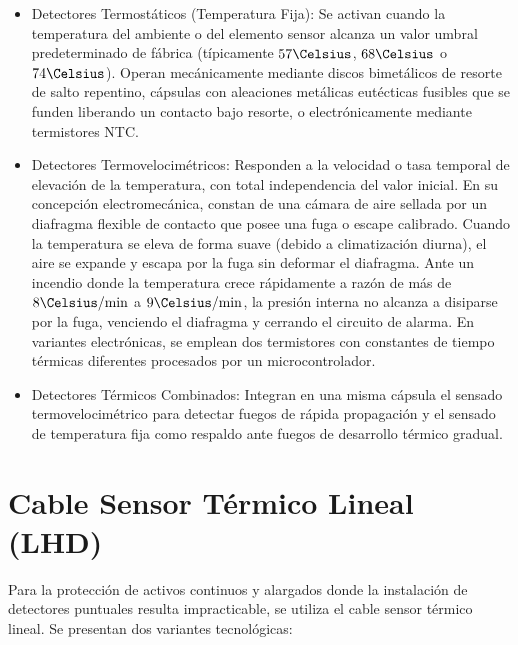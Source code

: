 \begin{itemize}
    \item Detectores Termostáticos (Temperatura Fija): Se activan cuando la temperatura del ambiente o del elemento
          sensor alcanza un valor umbral predeterminado de fábrica (típicamente $57\Celsius$, $68\Celsius$ o $74\Celsius$).
          Operan mecánicamente mediante discos bimetálicos de resorte de salto repentino, cápsulas con aleaciones metálicas
          eutécticas fusibles que se funden liberando un contacto bajo resorte, o electrónicamente mediante termistores NTC.
    \item Detectores Termovelocimétricos: Responden a la velocidad o tasa temporal de elevación de
          la temperatura, con total independencia del valor inicial. En su concepción electromecánica, constan de una cámara
          de aire sellada por un diafragma flexible de contacto que posee una fuga o escape calibrado. Cuando la temperatura
          se eleva de forma suave (debido a climatización diurna), el aire se expande y escapa por la fuga sin deformar el
          diafragma. Ante un incendio donde la temperatura crece rápidamente a razón de más de $8\Celsius/\mathrm{min}$ a
          $9\Celsius/\mathrm{min}$, la presión interna no alcanza a disiparse por la fuga, venciendo el diafragma y cerrando
          el circuito de alarma. En variantes electrónicas, se emplean dos termistores con constantes de tiempo térmicas
          diferentes procesados por un microcontrolador.
    \item Detectores Térmicos Combinados: Integran en una misma cápsula el sensado termovelocimétrico para detectar fuegos
          de rápida propagación y el sensado de temperatura fija como respaldo ante fuegos de desarrollo térmico gradual.
\end{itemize}

\section{Cable Sensor Térmico Lineal (LHD)}

Para la protección de activos continuos y alargados donde la instalación de detectores puntuales resulta impracticable, se
utiliza el cable sensor térmico lineal. Se presentan dos variantes tecnológicas:

